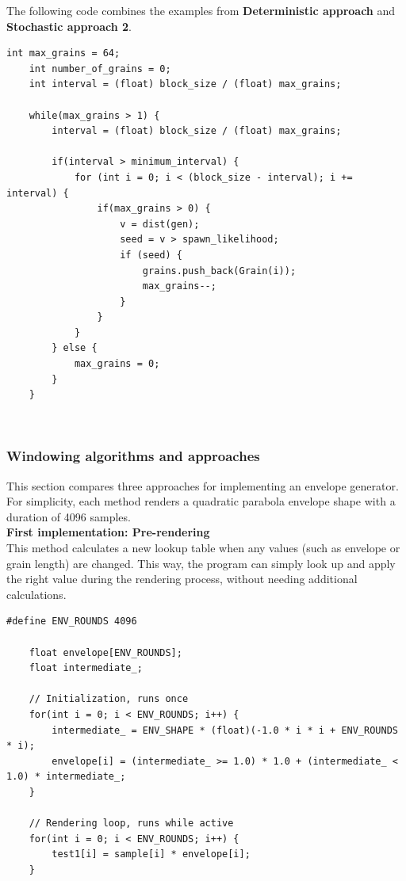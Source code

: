 \documentclass[10pt, twocolumn]{IEEEtran}
\begin{document}
The following code combines the examples from \textbf{Deterministic approach} and \textbf{Stochastic approach 2}.\\
\begin{minipage}{\linewidth}
\begin{lstlisting}[caption={An implementation of a divide-down algorithm}]
	int max_grains = 64;
	int number_of_grains = 0;	
	int interval = (float) block_size / (float) max_grains;

	while(max_grains > 1) {
		interval = (float) block_size / (float) max_grains;
		
		if(interval > minimum_interval) {
			for (int i = 0; i < (block_size - interval); i += interval) {
				if(max_grains > 0) {
					v = dist(gen);
					seed = v > spawn_likelihood;
					if (seed) {
						grains.push_back(Grain(i));
						max_grains--;
					}
				}
			}
		} else {
			max_grains = 0;
		}
	}
\end{lstlisting}
\end{minipage}\\

\subsubsection{Windowing algorithms and approaches}
This section compares three approaches for implementing an envelope generator. For simplicity, each method renders a quadratic parabola envelope shape with a duration of 4096 samples.  \\

\textbf{First implementation: Pre-rendering}\\
This method calculates a new lookup table when any values (such as envelope or grain length) are changed. This way, the program can simply look up and apply the right value during the rendering process, without needing additional calculations.\\
\begin{minipage}{\linewidth}
\begin{lstlisting}[caption={Envelope application using a pre-rendering algorithm}]
	#define ENV_ROUNDS 4096
		
	float envelope[ENV_ROUNDS];
	float intermediate_;
		
	// Initialization, runs once
	for(int i = 0; i < ENV_ROUNDS; i++) {
		intermediate_ = ENV_SHAPE * (float)(-1.0 * i * i + ENV_ROUNDS * i);
		envelope[i] = (intermediate_ >= 1.0) * 1.0 + (intermediate_ < 1.0) * intermediate_;
	}
		
	// Rendering loop, runs while active
	for(int i = 0; i < ENV_ROUNDS; i++) {
		test1[i] = sample[i] * envelope[i];
	}
\end{lstlisting}
\end{minipage}
\end{document}
